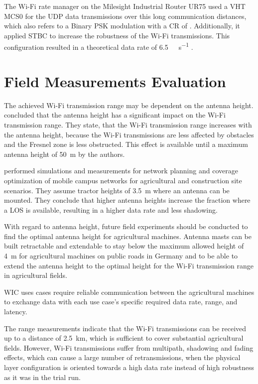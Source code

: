 The Wi-Fi rate manager on the Milesight Industrial Router UR75 used a \ac{VHT} \ac{MCS}0 for the \ac{UDP} data transmissions over this long communication distances, which also refers to a Binary \ac{PSK} modulation with a \ac{CR} of .
Additionally, it applied \ac{STBC} to increase the robustness of the Wi-Fi transmissions. This configuration resulted in a theoretical data rate of \SI{6.5}{\mega\bit\per\second} \cite{ieee_standard_2020}.

\section{Field Measurements Evaluation}

The achieved Wi-Fi transmission range may be dependent on the antenna height. \textcite{brinkhoff_characterization_2017} concluded that
the antenna height has a significant impact on the Wi-Fi transmission range.
They state, that the Wi-Fi transmission range increases
with the antenna height, because the Wi-Fi transmissions are less affected by obstacles and the Fresnel zone is less obstructed.
This effect is available until a maximum antenna height of \SI{50}{\metre} by the authors.

\textcite{krause_network_2021} performed simulations and measurements for network planning and coverage optimization
of mobile campus networks for agricultural and construction site scenarios.
They assume tractor heights of \SI{3. 5}{\metre} where an antenna can be mounted.
They conclude that higher antenna heights increase the fraction where a \ac{LOS} is available, resulting in
a higher data rate and less shadowing.

With regard to antenna height, future field experiments should be conducted to find the optimal antenna height for
agricultural machines.
Antenna masts can be built retractable and extendable to stay below the maximum allowed height of \SI{4}{\metre} for
agricultural machines on public roads in Germany and to be able to extend the antenna height to the optimal height
for the Wi-Fi transmission range in agricultural fields.

\ac{WIC} uses cases require reliable communication between the agricultural machines to exchange data
with each use case's specific required data rate, range, and latency.

The range measurements indicate that the Wi-Fi transmissions can be received up to a distance of \SI{2.5}{\kilo\metre},
which is sufficient to cover substantial agricultural fields.
However, Wi-Fi transmissions suffer from multipath, shadowing and fading effects, which can cause a large number of retransmissions,
when the physical layer configuration is oriented towards a high data rate instead of high robustness as it was
in the trial run.

